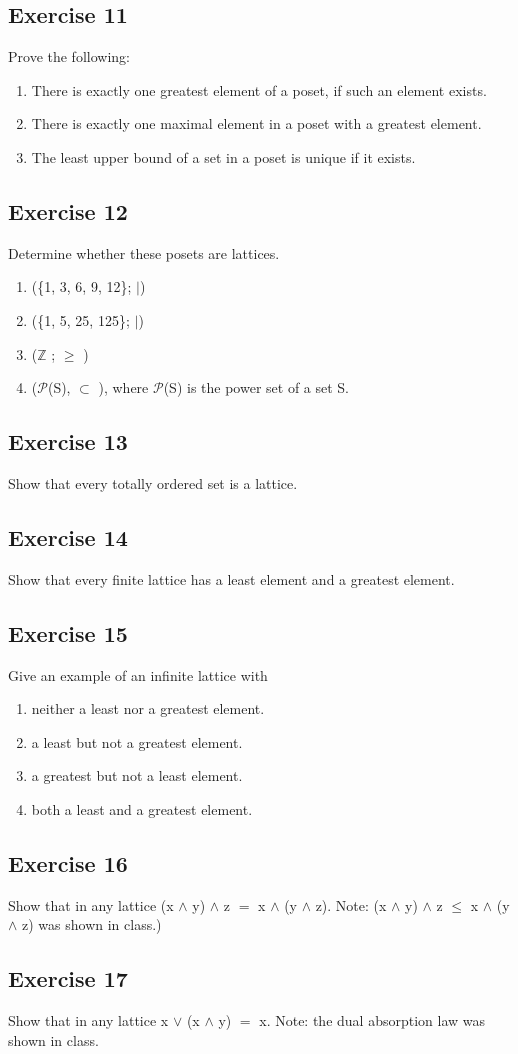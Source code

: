 \documentclass{article}
\newcommand{\mt}[1]{\ensuremath{#1}}
\newcommand\ssc[2][\DefaultOpt]{%
  \def\DefaultOpt{#2}%
  \subsection[#1]{#2}%
}
\newcommand{\balist}{\begin{enumerate}[label=\alph*.]}
\newcommand{\elist}{\end{enumerate}}
\newcommand{\bz}{\mt{\mathbb{Z}} }       %
\newcommand{\sbs}{\mt{\subset} }         %
\newcommand{\bk}[1]{\{#1\}}
\newcommand{\lse}{\mt{\leq} }
\newcommand{\gre}{\mt{\geq} }
\newcommand{\eql}{\mt{=} }
\newcommand{\lgnd}{\mt{\land} }
\newcommand{\lgor}{\mt{\lor} }
\begin{document}
\ssc{Exercise 11}{

Prove the following:

\balist
\item There is exactly one greatest element of a poset, if such an element exists.
\item There is exactly one maximal element in a poset with a greatest element.
\item The least upper bound of a set in a poset is unique if it exists.
\elist

}

\ssc{Exercise 12}{

Determine whether these posets are lattices.

\balist
\item (\bk{1, 3, 6, 9, 12}; $\vert$)
\item (\bk{1, 5, 25, 125}; $\vert$)
\item (\bz; \gre)
\item ($\mathcal{P}$(S), \sbs), where $\mathcal{P}$(S) is the power set of a set S.
\elist

}

\ssc{Exercise 13}{

Show that every totally ordered set is a lattice.

}

\ssc{Exercise 14}{

Show that every finite lattice has a least element and a greatest element.

}

\ssc{Exercise 15}{

Give an example of an infinite lattice with 

\balist
\item neither a least nor a greatest element.
\item a least but not a greatest element.
\item a greatest but not a least element.
\item both a least and a greatest element.
\elist

}

\ssc{Exercise 16}{

Show that in any lattice (x \lgnd y) \lgnd z \eql x \lgnd (y \lgnd z). Note: (x \lgnd y) \lgnd z \lse x \lgnd (y \lgnd z) was shown in class.)

}

\ssc{Exercise 17}{

Show that in any lattice x \lgor (x \lgnd y) \eql x. Note: the dual absorption law was shown in class.

}
\end{document}

